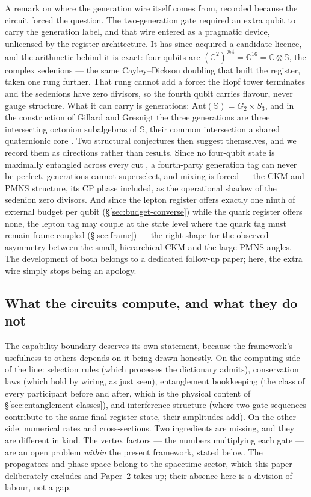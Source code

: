 A remark on where the generation wire itself comes from, recorded because the circuit forced the
question. The two-generation gate required an extra qubit to carry the generation label, and that
wire entered as a pragmatic device, unlicensed by the register architecture. It has since acquired
a candidate licence, and the arithmetic behind it is exact: four qubits are
$(\mathbb{C}^2)^{\otimes 4} = \mathbb{C}^{16} = \mathbb{C}\otimes\mathbb{S}$, the complex
sedenions --- the same Cayley--Dickson doubling that built the register, taken one rung further.
That rung cannot add a force: the Hopf tower terminates and the sedenions have zero divisors, so
the fourth qubit carries flavour, never gauge structure. What it can carry is generations:
$\mathrm{Aut}(\mathbb{S}) = G_2 \times S_3$, and in the construction of Gillard and Gresnigt the
three generations are three intersecting octonion subalgebras of $\mathbb{S}$, their common
intersection a shared quaternionic core \autocite{gillardgresnigt2019three}. Two structural
conjectures then suggest themselves, and we record them as directions rather than results. Since no
four-qubit state is maximally entangled across every cut
\autocite{higuchisudbery2000,hubersiewert2026}, a fourth-party generation tag can never be
perfect, generations cannot superselect, and mixing is forced --- the CKM and PMNS structure, its CP phase included, as the operational shadow
of the sedenion zero divisors. And since the lepton register offers exactly one
ninth of external budget per qubit (\S\ref{sec:budget-converse}) while the quark register offers
none, the lepton tag may couple at the state level where the quark tag must remain frame-coupled
(\S\ref{sec:frame}) --- the right shape for the observed asymmetry between the small,
hierarchical CKM and the large PMNS angles. The development of both belongs to a dedicated
follow-up paper; here, the extra wire simply stops being an apology.

\subsection{What the circuits compute, and what they do not}

The capability boundary deserves its own statement, because the framework's usefulness to others
depends on it being drawn honestly. On the computing side of the line: selection rules (which
processes the dictionary admits), conservation laws (which hold by wiring, as just seen),
entanglement bookkeeping (the class of every participant before and after, which is the physical
content of \S\ref{sec:entanglement-classes}), and interference structure (where two gate sequences
contribute to the same final register state, their amplitudes add). On the other side: numerical
rates and cross-sections. Two ingredients are missing, and they are different in kind. The vertex
factors --- the numbers multiplying each gate --- are an open problem \emph{within} the present
framework, stated below. The propagators and phase space belong to the spacetime sector, which this
paper deliberately excludes and Paper~2 takes up; their absence here is a division of labour, not a
gap.

